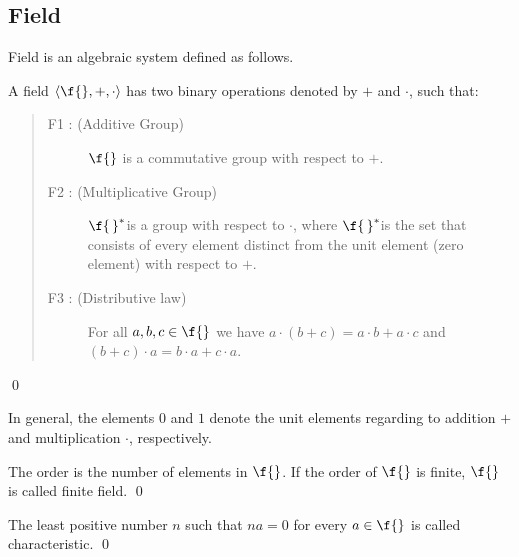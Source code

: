 \subsection{Field}
Field is an algebraic system defined as follows.
\begin{definition}[Field]
A field $\langle\f{},+,\cdot\rangle$ has two binary operations denoted by $+$ and $\cdot$, such that:
\begin{quote}\begin{description}
\item[F1 : (Additive Group)] $\f{}$ is a commutative group with respect to $+$.
\item[F2 : (Multiplicative Group)] ${\f{\,}}^{\ast}\!\!$ is a group with respect to $\cdot$, where ${\f{\,}}^{\ast}\!\!$ is the set that consists of every element distinct from the unit element (zero element) with respect to $+$.
\item[F3 : (Distributive law)] For all $a,b,c \in\f{}$ we have $a\cdot(b+c)=a\cdot b+a\cdot c$ and $(b+c)\cdot a=b\cdot a +c\cdot a$.
\end{description}\end{quote}
\qed
\end{definition}
In general, the elements $0$ and $1$ denote the unit elements regarding to addition $+$ and multiplication $\cdot$, respectively.
\begin{definition}\hspace{0em}
The order is the number of elements in $\f{}$. If the order of $\f{}$ is finite, $\f{}$ is called finite field. \qed
\end{definition}
\begin{definition}\hspace{0em}
The least positive number $n$ such that $na=0$ for every $a\in \f{}$ is called characteristic. \qed
\end{definition}

